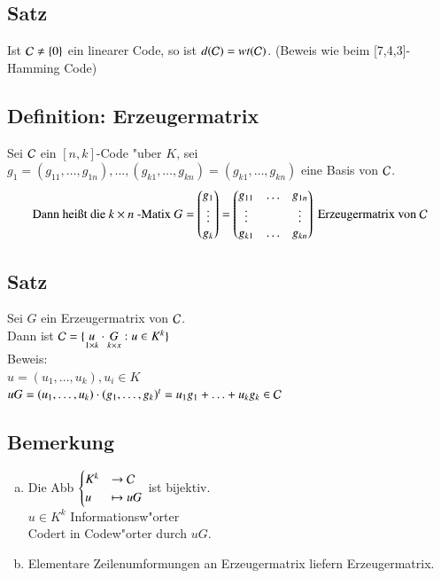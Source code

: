 \subsection{Satz}
Ist $\mathcal{C} \neq \lbrace 0 \rbrace$ ein linearer Code, so ist $d(\mathcal{C})=wt(\mathcal{C})$. (Beweis wie beim [7,4,3]-Hamming Code)

\subsection{Definition: Erzeugermatrix} %
Sei $\mathcal{C}$ ein $[n,k]$-Code "uber $K$, sei $g_1=(g_{11},\ldots,g_{1n}),\ldots,(g_{k1},\ldots,g_{kn})=(g_{k1},\ldots,g_{kn})$ eine Basis von $\mathcal{C}$.
\[
\text{Dann hei\ss t die } k\times n\text{ -Matix } G=
\begin{pmatrix}
g_1\\
\vdots \\
g_k\\
\end{pmatrix}
=
\begin{pmatrix}
	g_{11}&\ldots&g_{1n}\\
	\vdots&&\vdots\\
	g_{k1}&\ldots&g_{kn}
\end{pmatrix}
\text{ Erzeugermatrix von } \mathcal{C}
\]
\subsection{Satz}
Sei $G$ ein Erzeugermatrix von $\mathcal{C}$.\\
Dann ist $\mathcal{C} = \lbrace \underset{1\times k}{u} \cdot \underset{k\times x}{G}: u \in K^k \rbrace$\\
Beweis:\\
$u=(u_1,\ldots,u_k),u_i\in K$\\
$uG=(u_1,\ldots,u_k) \cdot (g_1,\ldots,g_k)^t=u_1g_1+\ldots + u_kg_k \in \mathcal{C}$\\
\subsection{Bemerkung}
\begin{enumerate}[a)]
	\item Die Abb 
	$\begin{cases}
		K^k & \rightarrow \mathcal{C}\\
		u & \mapsto uG
	\end{cases}$ ist bijektiv. \\
	$u \in K^k$ Informationsw"orter \\
	Codert in Codew"orter durch $uG$.
	\item Elementare Zeilenumformungen an Erzeugermatrix liefern Erzeugermatrix.
\end{enumerate}

